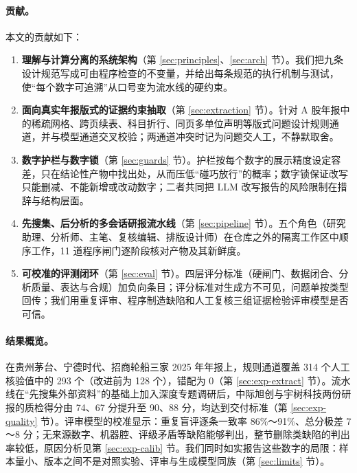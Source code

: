 \paragraph{贡献。}本文的贡献如下：
\begin{enumerate}
  \item \textbf{理解与计算分离的系统架构}（第 \ref{sec:principles}、\ref{sec:arch} 节）。我们把九条设计规范写成可由程序检查的不变量，并给出每条规范的执行机制与测试，使“每个数字可追溯”从口号变为流水线的硬约束。
  \item \textbf{面向真实年报版式的证据约束抽取}（第 \ref{sec:extraction} 节）。针对 A 股年报中的稀疏网格、跨页续表、科目折行、同页多单位声明等版式问题设计规则通道，并与模型通道交叉校验；两通道冲突时记为问题交人工，不静默取舍。
  \item \textbf{数字护栏与数字锁}（第 \ref{sec:guards} 节）。护栏按每个数字的展示精度设定容差，只在结论性产物中找出处，从而压低“碰巧放行”的概率；数字锁保证改写只能删减、不能新增或改动数字；二者共同把 LLM 改写报告的风险限制在措辞与结构层面。
  \item \textbf{先搜集、后分析的多会话研报流水线}（第 \ref{sec:pipeline} 节）。五个角色（研究助理、分析师、主笔、复核编辑、排版设计师）在仓库之外的隔离工作区中顺序工作，11 道程序闸门逐阶段核对产物及其新鲜度。
  \item \textbf{可校准的评测闭环}（第 \ref{sec:eval} 节）。四层评分标准（硬闸门、数据闭合、分析质量、表达与合规）加负向条目；评分标准对生成方不可见，问题单按类型回传；我们用重复评审、程序制造缺陷和人工复核三组证据检验评审模型是否可信。
\end{enumerate}

\paragraph{结果概览。}在贵州茅台、宁德时代、招商轮船三家 2025 年年报上，规则通道覆盖 314 个人工核验值中的 293 个（改进前为 128 个），错配为 0（第 \ref{sec:exp-extract} 节）。流水线在“先搜集外部资料”的基础上加入深度专题调研后，中际旭创与宇树科技两份研报的质检得分由 74、67 分提升至 90、88 分，均达到交付标准（第 \ref{sec:exp-quality} 节）。评审模型的校准显示：重复盲评逐条一致率 86\%～91\%、总分极差 7～8 分；无来源数字、机器腔、评级矛盾等缺陷能够判出，整节删除类缺陷的判出率较低，原因分析见第 \ref{sec:exp-calib} 节。我们同时如实报告这些数字的局限：样本量小、版本之间不是对照实验、评审与生成模型同族（第 \ref{sec:limits} 节）。

